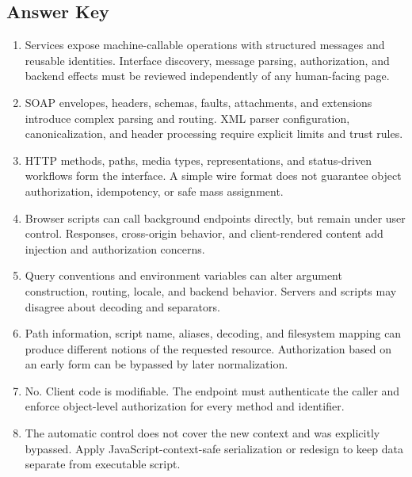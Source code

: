 \documentclass[11pt,letterpaper]{article}
\begin{document}
\subsection*{Answer Key}
\begin{enumerate}
\item Services expose machine-callable operations with structured messages and reusable identities. Interface discovery, message parsing, authorization, and backend effects must be reviewed independently of any human-facing page.
\item SOAP envelopes, headers, schemas, faults, attachments, and extensions introduce complex parsing and routing. XML parser configuration, canonicalization, and header processing require explicit limits and trust rules.
\item HTTP methods, paths, media types, representations, and status-driven workflows form the interface. A simple wire format does not guarantee object authorization, idempotency, or safe mass assignment.
\item Browser scripts can call background endpoints directly, but remain under user control. Responses, cross-origin behavior, and client-rendered content add injection and authorization concerns.
\item Query conventions and environment variables can alter argument construction, routing, locale, and backend behavior. Servers and scripts may disagree about decoding and separators.
\item Path information, script name, aliases, decoding, and filesystem mapping can produce different notions of the requested resource. Authorization based on an early form can be bypassed by later normalization.
\item No. Client code is modifiable. The endpoint must authenticate the caller and enforce object-level authorization for every method and identifier.
\item The automatic control does not cover the new context and was explicitly bypassed. Apply JavaScript-context-safe serialization or redesign to keep data separate from executable script.
\end{enumerate}
\end{document}
